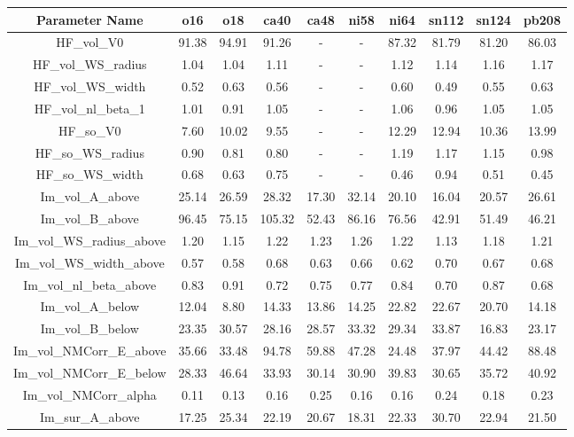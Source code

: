 \begin{tabular}{|c||c||c||c||c||c||c||c||c||c|} 
    \hline 
    \bf{Parameter Name}& \bf{o16}& \bf{o18}& \bf{ca40}& \bf{ca48}& \bf{ni58}& \bf{ni64}& \bf{sn112}& \bf{sn124}& \bf{pb208}\\
    \hline
    \hline 
    HF\_vol\_V0 & 91.38 & 94.91 & 91.26 & - & - & 87.32 & 81.79 & 81.20 & 86.03\\
    HF\_vol\_WS\_radius & 1.04 & 1.04 & 1.11 & - & - & 1.12 & 1.14 & 1.16 & 1.17\\
    HF\_vol\_WS\_width & 0.52 & 0.63 & 0.56 & - & - & 0.60 & 0.49 & 0.55 & 0.63\\
    HF\_vol\_nl\_beta\_1 & 1.01 & 0.91 & 1.05 & - & - & 1.06 & 0.96 & 1.05 & 1.05\\
    HF\_so\_V0 & 7.60 & 10.02 & 9.55 & - & - & 12.29 & 12.94 & 10.36 & 13.99\\
    HF\_so\_WS\_radius & 0.90 & 0.81 & 0.80 & - & - & 1.19 & 1.17 & 1.15 & 0.98\\
    HF\_so\_WS\_width & 0.68 & 0.63 & 0.75 & - & - & 0.46 & 0.94 & 0.51 & 0.45\\
    Im\_vol\_A\_above & 25.14 & 26.59 & 28.32 & 17.30 & 32.14 & 20.10 & 16.04 & 20.57 & 26.61\\
    Im\_vol\_B\_above & 96.45 & 75.15 & 105.32 & 52.43 & 86.16 & 76.56 & 42.91 & 51.49 & 46.21\\
    Im\_vol\_WS\_radius\_above & 1.20 & 1.15 & 1.22 & 1.23 & 1.26 & 1.22 & 1.13 & 1.18 & 1.21\\
    Im\_vol\_WS\_width\_above & 0.57 & 0.58 & 0.68 & 0.63 & 0.66 & 0.62 & 0.70 & 0.67 & 0.68\\
    Im\_vol\_nl\_beta\_above & 0.83 & 0.91 & 0.72 & 0.75 & 0.77 & 0.84 & 0.70 & 0.87 & 0.68\\
    Im\_vol\_A\_below & 12.04 & 8.80 & 14.33 & 13.86 & 14.25 & 22.82 & 22.67 & 20.70 & 14.18\\
    Im\_vol\_B\_below & 23.35 & 30.57 & 28.16 & 28.57 & 33.32 & 29.34 & 33.87 & 16.83 & 23.17\\
    Im\_vol\_NMCorr\_E\_above & 35.66 & 33.48 & 94.78 & 59.88 & 47.28 & 24.48 & 37.97 & 44.42 & 88.48\\
    Im\_vol\_NMCorr\_E\_below & 28.33 & 46.64 & 33.93 & 30.14 & 30.90 & 39.83 & 30.65 & 35.72 & 40.92\\
    Im\_vol\_NMCorr\_alpha & 0.11 & 0.13 & 0.16 & 0.25 & 0.16 & 0.16 & 0.24 & 0.18 & 0.23\\
    Im\_sur\_A\_above & 17.25 & 25.34 & 22.19 & 20.67 & 18.31 & 22.33 & 30.70 & 22.94 & 21.50\\

\end{tabular}
